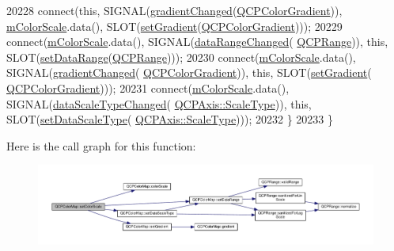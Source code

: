 \begin{DoxyCode}
20228     connect(\textcolor{keyword}{this}, SIGNAL(\hyperlink{class_q_c_p_color_map_abf4797f86e422ac6e0f732c4ff1a4d49}{gradientChanged}(\hyperlink{class_q_c_p_color_gradient}{QCPColorGradient})), 
      \hyperlink{class_q_c_p_color_map_a95b4100bacc3387652c988b071ec9db7}{mColorScale}.data(), SLOT(\hyperlink{class_q_c_p_color_map_a7313c78360471cead3576341a2c50377}{setGradient}(\hyperlink{class_q_c_p_color_gradient}{QCPColorGradient})));
20229     connect(\hyperlink{class_q_c_p_color_map_a95b4100bacc3387652c988b071ec9db7}{mColorScale}.data(), SIGNAL(\hyperlink{class_q_c_p_color_map_a482980f2335d09cfb36dd95ba9663197}{dataRangeChanged}(
      \hyperlink{class_q_c_p_range}{QCPRange})), \textcolor{keyword}{this}, SLOT(\hyperlink{class_q_c_p_color_map_a980b42837821159786a85b4b7dcb8774}{setDataRange}(\hyperlink{class_q_c_p_range}{QCPRange})));
20230     connect(\hyperlink{class_q_c_p_color_map_a95b4100bacc3387652c988b071ec9db7}{mColorScale}.data(), SIGNAL(\hyperlink{class_q_c_p_color_map_abf4797f86e422ac6e0f732c4ff1a4d49}{gradientChanged}(
      \hyperlink{class_q_c_p_color_gradient}{QCPColorGradient})), \textcolor{keyword}{this}, SLOT(\hyperlink{class_q_c_p_color_map_a7313c78360471cead3576341a2c50377}{setGradient}(
      \hyperlink{class_q_c_p_color_gradient}{QCPColorGradient})));
20231     connect(\hyperlink{class_q_c_p_color_map_a95b4100bacc3387652c988b071ec9db7}{mColorScale}.data(), SIGNAL(\hyperlink{class_q_c_p_color_map_a978d5d5c9f68cffef8c902b855c04490}{dataScaleTypeChanged}(
      \hyperlink{class_q_c_p_axis_a36d8e8658dbaa179bf2aeb973db2d6f0}{QCPAxis::ScaleType})), \textcolor{keyword}{this}, SLOT(\hyperlink{class_q_c_p_color_map_a9d20aa08e3c1f20f22908c45b9c06511}{setDataScaleType}(
      \hyperlink{class_q_c_p_axis_a36d8e8658dbaa179bf2aeb973db2d6f0}{QCPAxis::ScaleType})));
20232   \}
20233 \}
\end{DoxyCode}


Here is the call graph for this function\+:\nopagebreak
\begin{figure}[H]
\begin{center}
\leavevmode
\includegraphics[width=350pt]{class_q_c_p_color_map_aa828921db364fe3c6af4619580ab85fd_cgraph}
\end{center}
\end{figure}


